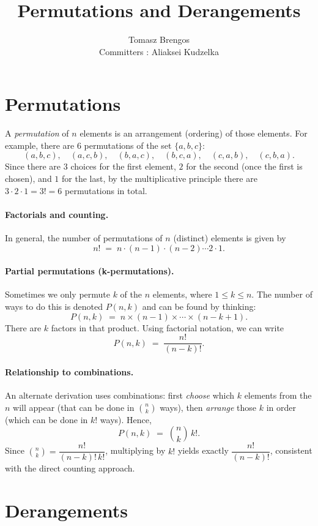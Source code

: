 \documentclass{article}
\title{Permutations and Derangements}
\author{Tomasz Brengos \\  
Committers : Aliaksei Kudzelka}
\date{}
\begin{document}
\maketitle

\section{Permutations}
A \emph{permutation} of $n$ elements is an arrangement (ordering) of those elements.
For example, there are $6$ permutations of the set $\{a,b,c\}$:
\[
(a,b,c), \quad (a,c,b), \quad (b,a,c), \quad (b,c,a), \quad (c,a,b), \quad (c,b,a).
\]
Since there are $3$ choices for the first element, $2$ for the second (once the first is chosen), and $1$ for the last, by the multiplicative principle there are $3 \cdot 2 \cdot 1 = 3! = 6$ permutations in total.

\paragraph{Factorials and counting.}
In general, the number of permutations of $n$ (distinct) elements is given by
\[
n! \;=\; n \cdot (n-1) \cdot (n-2) \cdots 2 \cdot 1.
\]


\paragraph{Partial permutations (k-permutations).}
Sometimes we only permute $k$ of the $n$ elements, where $1 \le k \le n$. The number of ways to do this is denoted $P(n,k)$ and can be found by thinking:
\[
P(n,k) \;=\; n \times (n-1) \times \cdots \times (n-k+1).
\]
There are $k$ factors in that product. Using factorial notation, we can write
\[
P(n,k) \;=\; \frac{n!}{(n-k)!}.
\]

\paragraph{Relationship to combinations.}
An alternate derivation uses combinations: first \emph{choose} which $k$ elements from the $n$ will appear (that can be done in $\binom{n}{k}$ ways), then \emph{arrange} those $k$ in order (which can be done in $k!$ ways). Hence,
\[
P(n,k) \;=\; \binom{n}{k} \, k!.
\]
Since $\binom{n}{k} = \dfrac{n!}{(n-k)!\,k!}$, multiplying by $k!$ yields exactly $\dfrac{n!}{(n-k)!}$, consistent with the direct counting approach.

\section{Derangements}
\end{document}
